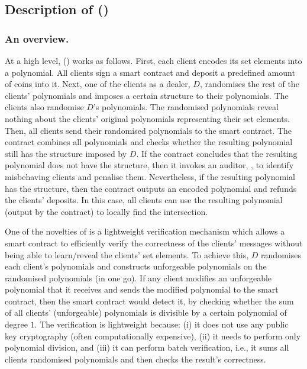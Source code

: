  \vs
 \vs
  
\subsection{Description of \withFai (\fpsi)}\label{Fair-PSI-Protocol}

\subsubsection{An overview.} At a high level, \withFai (\fpsi) works as follows. First, each client encodes its set elements into a polynomial. All clients sign a smart contract and deposit a predefined amount of coins into it.  Next,  one of the clients as a dealer, $D$, randomises the rest of the clients' polynomials and imposes a certain structure to their polynomials. The clients also randomise $D$'s polynomials. The randomised polynomials reveal nothing about the clients' original polynomials representing their set elements. Then, all clients send their randomised polynomials to the smart contract.  The contract combines all polynomials and checks whether the resulting polynomial still has the structure imposed by $D$. If the contract concludes that the resulting polynomial does not have the structure, then it invokes an auditor, \aud, to identify misbehaving clients and penalise them. Nevertheless, if the resulting polynomial has the structure, then the contract outputs an encoded polynomial and refunds the clients' deposits. In this case, all clients can use the resulting polynomial (output by the contract) to locally find the intersection.  







One of the novelties of \fpsi is a lightweight verification mechanism which allows a smart contract to efficiently verify the correctness of the clients' messages without being able to learn/reveal the clients' set elements. To achieve this, $D$ randomises each client's polynomials and constructs unforgeable polynomials on the randomised polynomials (in one go). If any client modifies an unforgeable polynomial that it receives and sends the modified polynomial to the smart contract,  then the smart contract would detect it, by checking whether the sum of all clients' (unforgeable) polynomials is divisible by a certain polynomial of degree $1$.  The verification is lightweight because: (i) it does not use any public key cryptography (often computationally expensive), (ii) it needs to perform only polynomial division, and (iii) it can perform batch verification, i.e., it sums all clients randomised polynomials and then checks the result's correctness.


